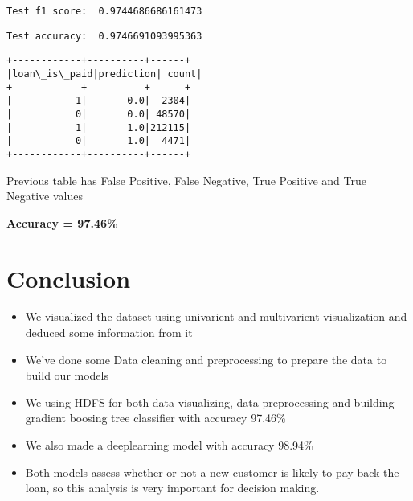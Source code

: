 \documentclass[11pt]{article}
\providecommand{\tightlist}{%
      \setlength{\itemsep}{0pt}\setlength{\parskip}{0pt}}
\begin{document}
    \begin{Verbatim}[commandchars=\\\{\}]
Test f1 score:  0.9744686686161473
    \end{Verbatim}

    \begin{Verbatim}[commandchars=\\\{\}]
Test accuracy:  0.9746691093995363
    \end{Verbatim}

    \begin{Verbatim}[commandchars=\\\{\}]
+------------+----------+------+
|loan\_is\_paid|prediction| count|
+------------+----------+------+
|           1|       0.0|  2304|
|           0|       0.0| 48570|
|           1|       1.0|212115|
|           0|       1.0|  4471|
+------------+----------+------+

    \end{Verbatim}

    Previous table has False Positive, False Negative, True Positive and
True Negative values

    \textbf{Accuracy = 97.46\%}

    \section{Conclusion}

    \begin{itemize}
\tightlist
\item
  We visualized the dataset using univarient and multivarient
  visualization and deduced some information from it
\item
  We've done some Data cleaning and preprocessing to prepare the data to
  build our models
\item
  We using HDFS for both data visualizing, data preprocessing and
  building gradient boosing tree classifier with accuracy 97.46\%
\item
  We also made a deeplearning model with accuracy 98.94\%
\item
  Both models assess whether or not a new customer is likely to pay back
  the loan, so this analysis is very important for decision making.
\end{itemize}


    
    
    
\end{document}
